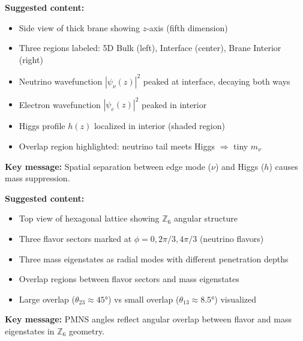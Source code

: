 
\begin{tcolorbox}[colback=gray!10, colframe=gray!50, title=\textbf{Figure Placeholder 1: Edge-Mode Localization Schematic}]
\textbf{Suggested content:}
\begin{itemize}[nosep]
    \item Side view of thick brane showing $z$-axis (fifth dimension)
    \item Three regions labeled: 5D Bulk (left), Interface (center), Brane Interior (right)
    \item Neutrino wavefunction $|\psi_\nu(z)|^2$ peaked at interface, decaying both ways
    \item Electron wavefunction $|\psi_e(z)|^2$ peaked in interior
    \item Higgs profile $h(z)$ localized in interior (shaded region)
    \item Overlap region highlighted: neutrino tail meets Higgs $\Rightarrow$ tiny $m_\nu$
\end{itemize}
\textbf{Key message:} Spatial separation between edge mode ($\nu$) and Higgs ($h$) causes mass suppression.
\end{tcolorbox}

\begin{tcolorbox}[colback=gray!10, colframe=gray!50, title=\textbf{Figure Placeholder 2: PMNS Mixing / Angular Overlap Intuition}]
\textbf{Suggested content:}
\begin{itemize}[nosep]
    \item Top view of hexagonal lattice showing $\mathbb{Z}_6$ angular structure
    \item Three flavor sectors marked at $\phi = 0, 2\pi/3, 4\pi/3$ (neutrino flavors)
    \item Three mass eigenstates as radial modes with different penetration depths
    \item Overlap regions between flavor sectors and mass eigenstates
    \item Large overlap ($\theta_{23} \approx 45°$) vs small overlap ($\theta_{13} \approx 8.5°$) visualized
\end{itemize}
\textbf{Key message:} PMNS angles reflect angular overlap between flavor and mass eigenstates in $\mathbb{Z}_6$ geometry.
\end{tcolorbox}

